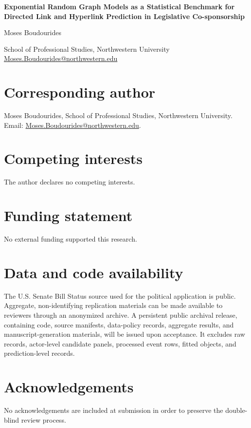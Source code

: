 \documentclass[12pt]{article}
\begin{document}
\begin{center}
{\Large\bfseries Exponential Random Graph Models as a Statistical Benchmark for Directed Link and Hyperlink Prediction in Legislative Co-sponsorship\par}
\vspace{1.5em}
{\large Moses Boudourides\par}
\vspace{0.5em}
School of Professional Studies, Northwestern University\\
\href{mailto:Moses.Boudourides@northwestern.edu}{Moses.Boudourides@northwestern.edu}
\end{center}

\section*{Corresponding author}
Moses Boudourides, School of Professional Studies, Northwestern University.
Email: \url{Moses.Boudourides@northwestern.edu}.

\section*{Competing interests}
The author declares no competing interests.

\section*{Funding statement}
No external funding supported this research.

\section*{Data and code availability}
The U.S. Senate Bill Status source used for the political application is public. Aggregate, non-identifying replication materials can be made available to reviewers through an anonymized archive. A persistent public archival release, containing code, source manifests, data-policy records, aggregate results, and manuscript-generation materials, will be issued upon acceptance. It excludes raw records, actor-level candidate panels, processed event rows, fitted objects, and prediction-level records.

\section*{Acknowledgements}
No acknowledgements are included at submission in order to preserve the double-blind review process.
\end{document}
